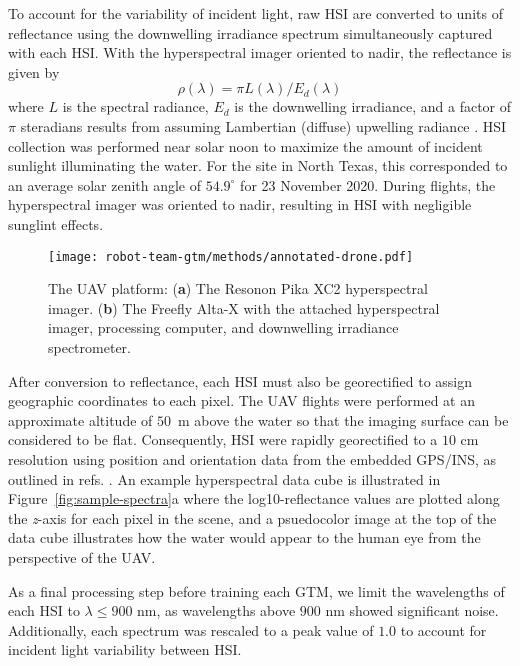 To account for the variability of incident light, raw HSI are converted to units of reflectance using the downwelling irradiance spectrum simultaneously captured with each HSI. With the hyperspectral imager oriented to nadir, the reflectance is given by
\begin{equation}\label{eq:reflectance}
    \rho(\lambda) = \pi L(\lambda)/E_d(\lambda)
\end{equation}
where $L$ is the spectral radiance, $E_d$ is the downwelling irradiance, and a factor of $\pi$ steradians results from assuming Lambertian (diffuse) upwelling radiance \cite{ruddick2019review}. HSI collection was performed near solar noon to maximize the amount of incident sunlight illuminating the water. For the site in North Texas, this corresponded to an average solar zenith angle of $54.9^\circ$ for 23 November 2020. During flights, the hyperspectral imager was oriented to nadir, resulting in HSI with negligible sunglint effects.


\begin{figure}[H]
  \centering
  \texttt{[image: robot-team-gtm/methods/annotated-drone.pdf]}
  \caption{The UAV platform: (\textbf{a}) The Resonon Pika XC2 hyperspectral
    imager. (\textbf{b}) The Freefly Alta-X with the attached hyperspectral
    imager, processing computer, and downwelling irradiance
    spectrometer. \label{fig:drone}}
\end{figure}




After conversion to reflectance, each HSI must also be georectified to assign geographic coordinates to each pixel. The UAV flights were performed at an approximate altitude of $50$~m above the water so that the imaging surface can be considered to be flat. Consequently, HSI were rapidly georectified to a $10$ cm resolution using position and orientation data from the embedded GPS/INS, as outlined in refs. \cite{muller2002program, baumker2001new, mostafa2000multi}. An example hyperspectral data cube is illustrated in Figure~\ref{fig:sample-spectra}a  where the log10-reflectance values are plotted along the \emph{z}-axis for each pixel in the scene, and a psuedocolor image at the top of the data cube illustrates how the water would appear to the human eye from the perspective of the UAV.

As a final processing step before training each GTM, we limit the wavelengths of each HSI to $\lambda \leq 900$ nm, as wavelengths above $900$ nm showed significant noise. Additionally, each spectrum was rescaled to a peak value of $1.0$ to account for incident light variability between HSI.

